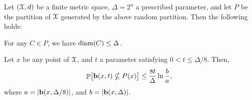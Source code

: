 \begin{lemma}
    Let $(\FMS,d)$ be a finite metric space, $\Delta = 2^u$ a prescribed
    parameter, and let $P$ be the partition of $\FMS$ generated by the
    above random partition. Then the following holds:
    \begin{compactenumi}
        \item For any $C \in P$, we have $\mathrm{diam}(C) \leq \Delta$.
    
        \item Let $x$ be any point of $\FMS$, and $t$ a parameter satisfying $0<t\leq\Delta/8$.  Then,
        \begin{equation*}
            \Prob{\bigl. \Ball(x,t) \nsubseteq P(x)}%
            \leq%
            \frac{8t}{\Delta} \ln \frac{b}{a},
        \end{equation*}
        where $a = |\mathbf{b}(x, \Delta/8)|$, and
        $b = |\mathbf{b}(x, \Delta)|$.
    \end{compactenumi}
\end{lemma}
